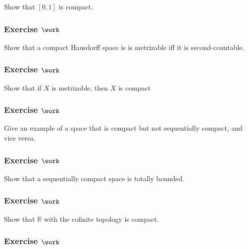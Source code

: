 Show that \([0, 1]\) is compact.

\hypertarget{exercise-work-25}{%
\subsubsection{\texorpdfstring{Exercise
\(\work\)}{Exercise \textbackslash work}}\label{exercise-work-25}}

Show that a compact Hausdorff space is is metrizable iff it is
second-countable.

\hypertarget{exercise-work-26}{%
\subsubsection{\texorpdfstring{Exercise
\(\work\)}{Exercise \textbackslash work}}\label{exercise-work-26}}

Show that if \(X\) is metrizable, then \(X\) is compact

\hypertarget{exercise-work-27}{%
\subsubsection{\texorpdfstring{Exercise
\(\work\)}{Exercise \textbackslash work}}\label{exercise-work-27}}

Give an example of a space that is compact but not sequentially compact,
and vice versa.

\hypertarget{exercise-work-28}{%
\subsubsection{\texorpdfstring{Exercise
\(\work\)}{Exercise \textbackslash work}}\label{exercise-work-28}}

Show that a sequentially compact space is totally bounded.

\hypertarget{exercise-work-29}{%
\subsubsection{\texorpdfstring{Exercise
\(\work\)}{Exercise \textbackslash work}}\label{exercise-work-29}}

Show that \({\mathbb{R}}\) with the cofinite topology is compact.

\hypertarget{exercise-work-30}{%
\subsubsection{\texorpdfstring{Exercise
\(\work\)}{Exercise \textbackslash work}}\label{exercise-work-30}}

